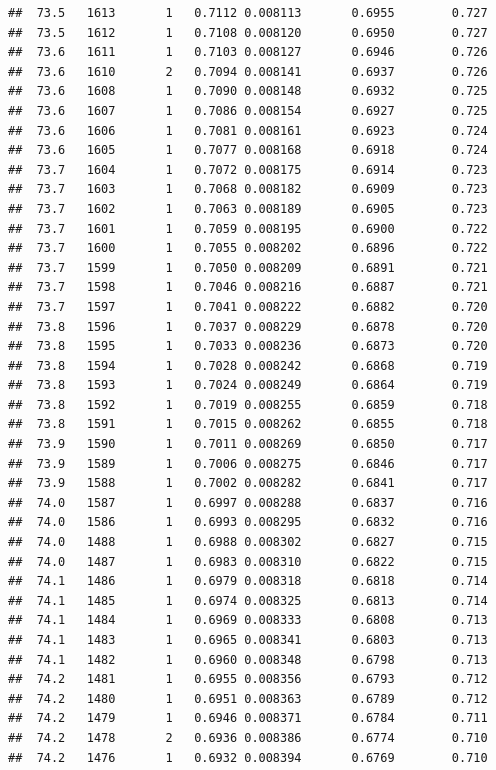 \documentclass[
]{book}
\begin{document}
\begin{verbatim}
##  73.5   1613       1   0.7112 0.008113       0.6955        0.727
##  73.5   1612       1   0.7108 0.008120       0.6950        0.727
##  73.6   1611       1   0.7103 0.008127       0.6946        0.726
##  73.6   1610       2   0.7094 0.008141       0.6937        0.726
##  73.6   1608       1   0.7090 0.008148       0.6932        0.725
##  73.6   1607       1   0.7086 0.008154       0.6927        0.725
##  73.6   1606       1   0.7081 0.008161       0.6923        0.724
##  73.6   1605       1   0.7077 0.008168       0.6918        0.724
##  73.7   1604       1   0.7072 0.008175       0.6914        0.723
##  73.7   1603       1   0.7068 0.008182       0.6909        0.723
##  73.7   1602       1   0.7063 0.008189       0.6905        0.723
##  73.7   1601       1   0.7059 0.008195       0.6900        0.722
##  73.7   1600       1   0.7055 0.008202       0.6896        0.722
##  73.7   1599       1   0.7050 0.008209       0.6891        0.721
##  73.7   1598       1   0.7046 0.008216       0.6887        0.721
##  73.7   1597       1   0.7041 0.008222       0.6882        0.720
##  73.8   1596       1   0.7037 0.008229       0.6878        0.720
##  73.8   1595       1   0.7033 0.008236       0.6873        0.720
##  73.8   1594       1   0.7028 0.008242       0.6868        0.719
##  73.8   1593       1   0.7024 0.008249       0.6864        0.719
##  73.8   1592       1   0.7019 0.008255       0.6859        0.718
##  73.8   1591       1   0.7015 0.008262       0.6855        0.718
##  73.9   1590       1   0.7011 0.008269       0.6850        0.717
##  73.9   1589       1   0.7006 0.008275       0.6846        0.717
##  73.9   1588       1   0.7002 0.008282       0.6841        0.717
##  74.0   1587       1   0.6997 0.008288       0.6837        0.716
##  74.0   1586       1   0.6993 0.008295       0.6832        0.716
##  74.0   1488       1   0.6988 0.008302       0.6827        0.715
##  74.0   1487       1   0.6983 0.008310       0.6822        0.715
##  74.1   1486       1   0.6979 0.008318       0.6818        0.714
##  74.1   1485       1   0.6974 0.008325       0.6813        0.714
##  74.1   1484       1   0.6969 0.008333       0.6808        0.713
##  74.1   1483       1   0.6965 0.008341       0.6803        0.713
##  74.1   1482       1   0.6960 0.008348       0.6798        0.713
##  74.2   1481       1   0.6955 0.008356       0.6793        0.712
##  74.2   1480       1   0.6951 0.008363       0.6789        0.712
##  74.2   1479       1   0.6946 0.008371       0.6784        0.711
##  74.2   1478       2   0.6936 0.008386       0.6774        0.710
##  74.2   1476       1   0.6932 0.008394       0.6769        0.710

\end{verbatim}
\end{document}
